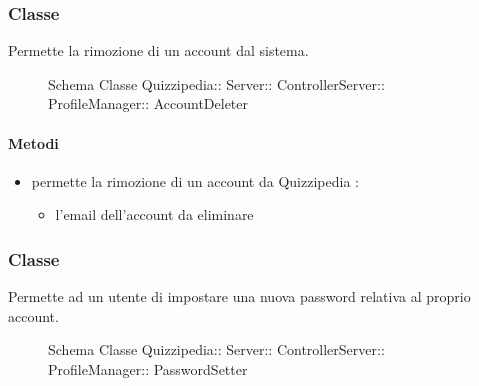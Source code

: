 \subsubsection{Classe }
Permette la rimozione di un account dal sistema.
\begin{figure}[H]
\centering
\noindent{}
\caption[Schema Classe AccountDeleter]{Schema Classe Quizzipedia:: Server:: ControllerServer:: ProfileManager:: AccountDeleter}
\end{figure}
\paragraph{Metodi}
\begin{itemize}
\item {}
\newline
permette la rimozione di un account da Quizzipedia
\newline
{} :
\begin{itemize}
\item {}
\newline
l'email dell'account da eliminare
\end{itemize}
\end{itemize}
\subsubsection{Classe }
Permette ad un utente di impostare una nuova password relativa al proprio account.
\begin{figure}[H]
\centering
\noindent{}
\caption[Schema Classe PasswordSetter]{Schema Classe Quizzipedia:: Server:: ControllerServer:: ProfileManager:: PasswordSetter}
\end{figure}
